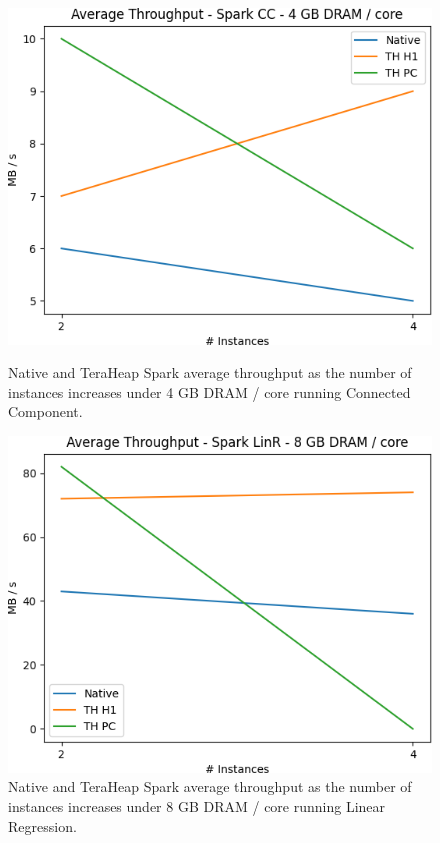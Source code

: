 \begin{figure}[thbp]
	\centering
        \includegraphics[width=\linewidth]{./fig/CC_64_THR.png}
    \caption{Native and TeraHeap Spark average throughput
        as the number of instances increases under 4 GB DRAM / core running Connected Component.}
		\label{fig:cc_64_thr}
        \includegraphics[width=\linewidth]{./fig/LINR_128_THR.png}
    \caption{Native and TeraHeap Spark average throughput
        as the number of instances increases under 8 GB DRAM / core running Linear Regression.}
        \label{fig:linr_128_thr}
\end{figure}

